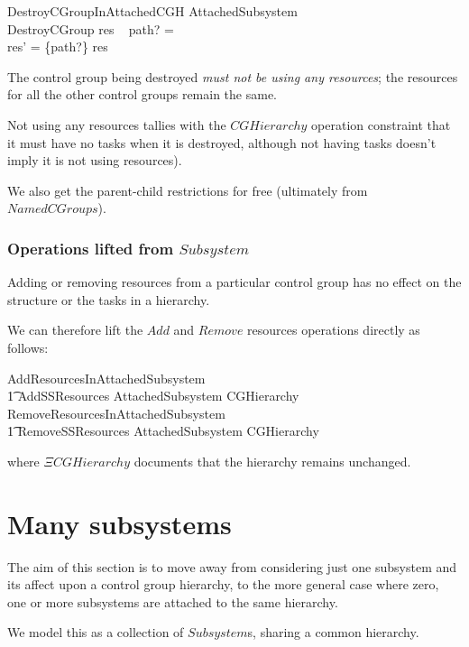 \documentclass[a4paper,twoside,12pt]{article}
\begin{document}
\begin{schema}{DestroyCGroupInAttachedCGH}
\Delta AttachedSubsystem \\
DestroyCGroup
\where
res ~ path? = \emptyset \\
res' = \{path?\} \ndres res
\end{schema}
The control group being destroyed \emph{must not be using any resources};
the resources for all the other control groups remain
the same.

Not using any resources tallies with the $CGHierarchy$ operation constraint that it must have no tasks when it is
destroyed, although not having tasks doesn't imply it is not using resources).

We also get the parent-child restrictions for free (ultimately from $NamedCGroups$).

\subsubsection{Operations lifted from $Subsystem$}

Adding or removing resources from a particular control group has no effect on the structure or the tasks
in a hierarchy.

We can therefore lift the $Add$ and $Remove$ resources operations directly as follows:

\begin{zed}
AddResourcesInAttachedSubsystem  \\
\t1 AddSSResources \land \Delta AttachedSubsystem \land \Xi CGHierarchy
\also
RemoveResourcesInAttachedSubsystem  \\
\t1 RemoveSSResources \land \Delta AttachedSubsystem \land \Xi CGHierarchy
\end{zed}
where $\Xi CGHierarchy$ documents that the hierarchy remains unchanged.

\section{Many subsystems}
\label{sec:manyss}

The aim of this section is to move away from considering just one subsystem and its affect upon
a control group hierarchy, to the more general case where zero, one or more subsystems are attached
to the same hierarchy.

We model this as a collection of $Subsystem$s, sharing a common hierarchy.
\end{document}
